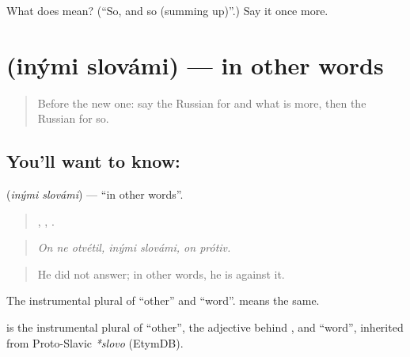 \begin{tcolorbox}[breakable,colback=teal!4,colframe=teal!35!black,title={Before you move on}]
What does  mean? (\textquotedblleft{}So, and so (summing up)\textquotedblright{}.) Say it once more.
\end{tcolorbox}
\section[\texorpdfstring{\ru{иными} \ru{словами} (inými slovámi)}{иными словами (inými slovámi)}]{  (inými slovámi) — in other words}

\label{lesson:RU-C347-inymi-slovami}



\begin{quote}
Before the new one: say the Russian for and what is more, then the Russian for so.
\end{quote}

\subsection*{You'll want to know:  }
\textbf{ } (\emph{inými slovámi}) — \textquotedblleft{}in other words\textquotedblright{}.

\begin{quote}
  ,  ,  .
\end{quote}

\begin{quote}
\emph{On ne otvétil, inými slovámi, on prótiv.}
\end{quote}

\begin{quote}
He did not answer; in other words, he is against it.
\end{quote}

The instrumental plural of \emph{} \textquotedblleft{}other\textquotedblright{} and \emph{} \textquotedblleft{}word\textquotedblright{}. \emph{ } means the same.

\begin{cousinweb}
\textbf{ } is the instrumental plural of \emph{} \textquotedblleft{}other\textquotedblright{}, the adjective behind \emph{}, and \emph{} \textquotedblleft{}word\textquotedblright{}, inherited from Proto-Slavic \emph{*slovo} (EtymDB).
\end{cousinweb}

